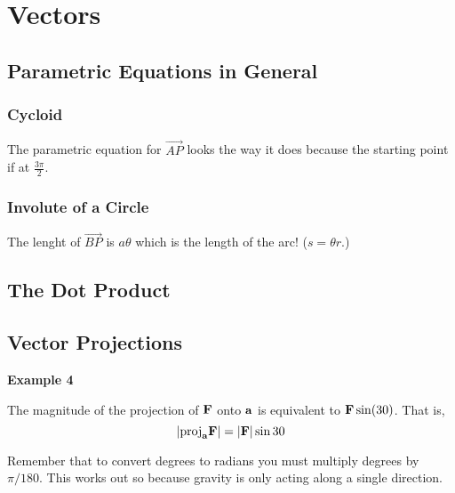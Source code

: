 \section{Vectors}

\subsection{Parametric Equations in General}

\subsubsection{Cycloid}

The parametric equation for $\overrightarrow{AP}$ looks the way it does because the starting point
if at $\frac{3\pi}{2}$.

\subsubsection{Involute of a Circle}

The lenght of $\overrightarrow{BP}$ is $a\theta$ which is the length of the arc! ($s=\theta r$.)


\subsection{The Dot Product}


\subsection{Vector Projections}

\textbf{Example 4}

The magnitude of the projection of $\boldsymbol{\mathbf{F}}$ onto $\boldsymbol{\mathbf{a}}$ is equivalent to $\boldsymbol{\mathbf{F}} \sin(30)$.
That is,
$$
|\text{proj}_{\boldsymbol{\mathbf{a}}} \boldsymbol{\mathbf{F}}| = |\boldsymbol{\mathbf{F}}| \sin 30
$$

Remember that to convert degrees to radians you must multiply degrees by $\pi / 180$.
This works out so because gravity is only acting along a single direction.